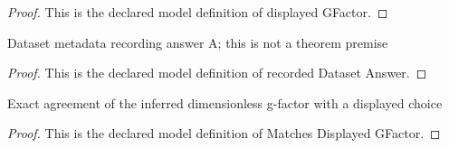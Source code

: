 \begin{proof}
  This is the declared model definition of displayed GFactor.
\end{proof}
\begin{definition}
  \label{def:physics:phyx-mini-0627:phyxminiproblems-problemphyxmini0627-recordeddatasetanswer}
  Dataset metadata recording answer A; this is not a theorem premise
\end{definition}
\begin{proof}
  This is the declared model definition of recorded Dataset Answer.
\end{proof}
\begin{definition}
  \label{def:physics:phyx-mini-0627:phyxminiproblems-problemphyxmini0627-matchesdisplayedgfactor}
  Exact agreement of the inferred dimensionless g-factor with a displayed choice
\end{definition}
\begin{proof}
  This is the declared model definition of Matches Displayed GFactor.
\end{proof}
